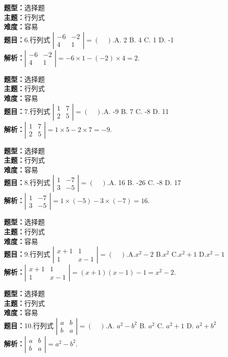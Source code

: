 \documentclass{ctexart}
\newenvironment{question}[5]{%
	\noindent\textbf{题型：}#1\\
	\textbf{主题：}#2\\
	\textbf{难度：}#3\\
	\textbf{题目：}#4\\
	\textbf{解析：}#5\\
	\vspace{1em}
}{}
\begin{document}
\begin{question}
	{选择题}
	{行列式}
	{容易}
	{6.行列式 $\left|\begin{array}{cc}-6 & -2 \\ 4 & 1\end{array}\right|=(\quad). $A. 2 \quad B. 4 \quad C. 1 \quad D. -1}
	{$\left|\begin{array}{cc}-6 & -2 \\ 4 & 1\end{array}\right|=-6 \times 1-(-2) \times 4=2.$}
\end{question}

\begin{question}
	{选择题}
	{行列式}
	{容易}
	{7.行列式 $\left|\begin{array}{ll}1 & 7 \\ 2 & 5\end{array}\right|=(\quad). $A. -9 \quad B. 7 \quad C. -8 \quad D. 11}
	{$\left|\begin{array}{ll}1 & 7 \\ 2 & 5\end{array}\right|=1 \times 5-2 \times 7=-9.$}
\end{question}

\begin{question}
	{选择题}
	{行列式}
	{容易}
	{8.行列式 $\left|\begin{array}{ll}1 & -7 \\ 3 & -5\end{array}\right|=(\quad). $A. 16 \quad B. -26 \quad C. -8 \quad D. 17}
	{$\left|\begin{array}{ll}1 & -7 \\ 3 & -5\end{array}\right|=1 \times(-5)-3 \times(-7)=16.$}
\end{question}


\begin{question}
	{选择题}
	{行列式}
	{容易}
	{9.行列式 $\left|\begin{array}{cc}x+1 & 1 \\ 1 & x-1\end{array}\right|=(\quad). $A.$x^2-2$ \quad B.$x^2$ \quad C.$x^2+1$ \quad D.$x^2-1$}
	{$\left|\begin{array}{cc}x+1 & 1 \\ 1 & x-1\end{array}\right|=(x+1)(x-1)-1=x^2-2.$}
\end{question}

\begin{question}
	{选择题}
	{行列式}
	{容易}
	{10.行列式 $\left|\begin{array}{ll}a & b \\ b & a\end{array}\right|=(\quad). $A. $a^2-b^2$ \quad B. $a^2$ \quad C. $a^2+1$ \quad D. $a^2+b^2$}
	{$\left|\begin{array}{ll}a & b \\ b & a\end{array}\right|=a^2-b^2$.}
\end{question}
\end{document}
